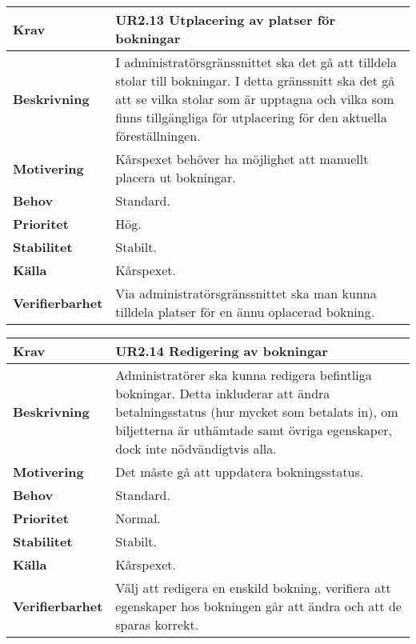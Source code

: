 \documentclass[a4paper, twoside, 11pt, titlepage]{article}
\begin{document}
		\begin{tabular} { p{2.6cm} p{12.5cm} }
			\hline
			\sffamily\textbf{Krav} & \sffamily\textbf{UR2.13 Utplacering av platser för bokningar  } \\
			\hline
			\sffamily\textbf{Beskrivning} & I administratörsgränssnittet ska det gå att tilldela stolar till bokningar. I detta gränssnitt ska det gå att se vilka stolar som är upptagna och vilka som finns tillgängliga för utplacering för den aktuella föreställningen.  \\
			\hline
			\sffamily\textbf{Motivering} & Kårspexet behöver ha möjlighet att manuellt placera ut bokningar.  \\
			\hline
			\sffamily\textbf{Behov} & Standard.  \\
			\hline
			\sffamily\textbf{Prioritet} & Hög.  \\
			\hline
			\sffamily\textbf{Stabilitet} & Stabilt.  \\
			\hline
			\sffamily\textbf{Källa} & Kårspexet.  \\
			\hline
			\sffamily\textbf{Verifierbarhet} & Via administratörsgränssnittet ska man kunna tilldela platser för en ännu oplacerad bokning.  \\
			\hline
		\end{tabular}
		\vspace{6mm}

		\begin{tabular} { p{2.6cm} p{12.5cm} }
			\hline
			\sffamily\textbf{Krav} & \sffamily\textbf{UR2.14 Redigering av bokningar  } \\
			\hline
			\sffamily\textbf{Beskrivning} & Administratörer ska kunna redigera befintliga bokningar. Detta inkluderar att ändra betalningsstatus (hur mycket som betalats in), om biljetterna är uthämtade samt övriga egenskaper, dock inte nödvändigtvis alla.  \\
			\hline
			\sffamily\textbf{Motivering} & Det måste gå att uppdatera bokningsstatus.  \\
			\hline
			\sffamily\textbf{Behov} & Standard.  \\
			\hline
			\sffamily\textbf{Prioritet} & Normal.  \\
			\hline
			\sffamily\textbf{Stabilitet} & Stabilt.  \\
			\hline
			\sffamily\textbf{Källa} & Kårspexet.  \\
			\hline
			\sffamily\textbf{Verifierbarhet} & Välj att redigera en enskild bokning, verifiera att egenskaper hos bokningen går att ändra och att de sparas korrekt.  \\
			\hline
		\end{tabular}
\end{document}
